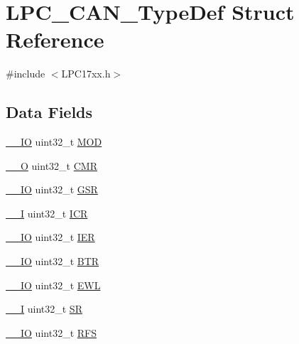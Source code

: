 \hypertarget{structLPC__CAN__TypeDef}{}\section{L\+P\+C\+\_\+\+C\+A\+N\+\_\+\+Type\+Def Struct Reference}
\label{structLPC__CAN__TypeDef}


{\ttfamily \#include $<$L\+P\+C17xx.\+h$>$}

\subsection*{Data Fields}
\begin{DoxyCompactItemize}
\item 
\hyperlink{LPC17xx_8h_aec43007d9998a0a0e01faede4133d6be}{\+\_\+\+\_\+\+IO} uint32\+\_\+t \hyperlink{structLPC__CAN__TypeDef_aa552e0d7073db33aef9d5fff30270385}{M\+OD}
\item 
\hyperlink{LPC17xx_8h_a7e25d9380f9ef903923964322e71f2f6}{\+\_\+\+\_\+O} uint32\+\_\+t \hyperlink{structLPC__CAN__TypeDef_a9c4aaea6fbeb16b7f985b0c1deea0a8a}{C\+MR}
\item 
\hyperlink{LPC17xx_8h_aec43007d9998a0a0e01faede4133d6be}{\+\_\+\+\_\+\+IO} uint32\+\_\+t \hyperlink{structLPC__CAN__TypeDef_aaebe05a3f2b42fe710cc55146232709c}{G\+SR}
\item 
\hyperlink{LPC17xx_8h_af63697ed9952cc71e1225efe205f6cd3}{\+\_\+\+\_\+I} uint32\+\_\+t \hyperlink{structLPC__CAN__TypeDef_ab36125aee673455a73715ac364e05b6c}{I\+CR}
\item 
\hyperlink{LPC17xx_8h_aec43007d9998a0a0e01faede4133d6be}{\+\_\+\+\_\+\+IO} uint32\+\_\+t \hyperlink{structLPC__CAN__TypeDef_aeb907d3a6919c93ca9951b62595facea}{I\+ER}
\item 
\hyperlink{LPC17xx_8h_aec43007d9998a0a0e01faede4133d6be}{\+\_\+\+\_\+\+IO} uint32\+\_\+t \hyperlink{structLPC__CAN__TypeDef_a461439cb1fa20001b5177c0589a2fdcc}{B\+TR}
\item 
\hyperlink{LPC17xx_8h_aec43007d9998a0a0e01faede4133d6be}{\+\_\+\+\_\+\+IO} uint32\+\_\+t \hyperlink{structLPC__CAN__TypeDef_ad14ee65dbb90b26a372a549efafa951a}{E\+WL}
\item 
\hyperlink{LPC17xx_8h_af63697ed9952cc71e1225efe205f6cd3}{\+\_\+\+\_\+I} uint32\+\_\+t \hyperlink{structLPC__CAN__TypeDef_af196d4014a0e6c89397940310a708025}{SR}
\item 
\hyperlink{LPC17xx_8h_aec43007d9998a0a0e01faede4133d6be}{\+\_\+\+\_\+\+IO} uint32\+\_\+t \hyperlink{structLPC__CAN__TypeDef_a1226fc21b1f4530138d8804d4616ee75}{R\+FS}

\end{DoxyCompactItemize}
